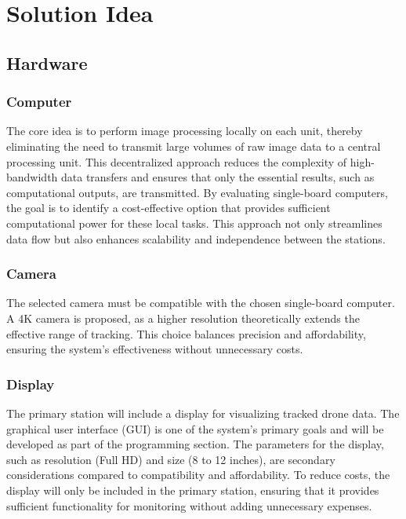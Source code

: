 \chapter{Solution Idea}

\section{Hardware}

\subsection{Computer}
The core idea is to perform image processing locally on each unit, thereby eliminating the need to transmit large volumes of raw image data to a central processing unit. This decentralized approach reduces the complexity of high-bandwidth data transfers and ensures that only the essential results, such as computational outputs, are transmitted. By evaluating single-board computers, the goal is to identify a cost-effective option that provides sufficient computational power for these local tasks. This approach not only streamlines data flow but also enhances scalability and independence between the stations.

\subsection{Camera}
The selected camera must be compatible with the chosen single-board computer. A 4K camera is proposed, as a higher resolution theoretically extends the effective range of tracking. This choice balances precision and affordability, ensuring the system's effectiveness without unnecessary costs.

\subsection{Display}
The primary station will include a display for visualizing tracked drone data. The graphical user interface (GUI) is one of the system's primary goals and will be developed as part of the programming section. The parameters for the display, such as resolution (Full HD) and size (8 to 12 inches), are secondary considerations compared to compatibility and affordability. To reduce costs, the display will only be included in the primary station, ensuring that it provides sufficient functionality for monitoring without adding unnecessary expenses.

